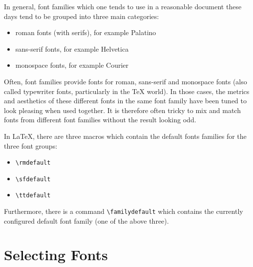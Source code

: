 \documentclass[a4paper,oneside,11pt]{article}
\newcommand\comm[1]{\texttt{\textbackslash#1}}
\begin{document}
In general,  font families  which one  tends to use  in a  reasonable document
these days tend to be grouped into three main categories\footnotemark:


\begin{itemize}
    \item {\selectfont roman fonts (with serifs), for example Palatino}
    \item {\selectfont sans-serif fonts, for example Helvetica}
    \item {\selectfont monospace fonts, for example Courier}
\end{itemize}

Often, font families  provide fonts for roman, sans-serif  and monospace fonts
(also called  typewriter fonts,  particularly in  the \TeX{}  world). In those
cases, the  metrics and aesthetics of  these different fonts in  the same font
family have  been tuned to look  pleasing when used together. It  is therefore
often tricky to  mix and match fonts from different  font families without the
result looking odd\footnotemark.


In \LaTeX, there are three macros which contain the default fonts families for
the three font groups:

\begin{itemize}
    \item \comm{rmdefault}
    \item \comm{sfdefault}
    \item \comm{ttdefault}
\end{itemize}

Furthermore,  there  is  a  command \comm{familydefault}  which  contains  the
currently configured default font family (one of the above three).

\section{Selecting Fonts}
\label{sec:setting-fonts}
\end{document}
